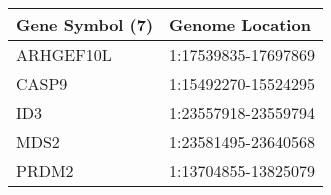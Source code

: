 \begin{tabular}{ll}
\toprule
Gene Symbol (7) &     Genome Location \\
\midrule
      ARHGEF10L & 1:17539835-17697869 \\
          CASP9 & 1:15492270-15524295 \\
            ID3 & 1:23557918-23559794 \\
           MDS2 & 1:23581495-23640568 \\
          PRDM2 & 1:13704855-13825079 \\
\bottomrule
\end{tabular}
